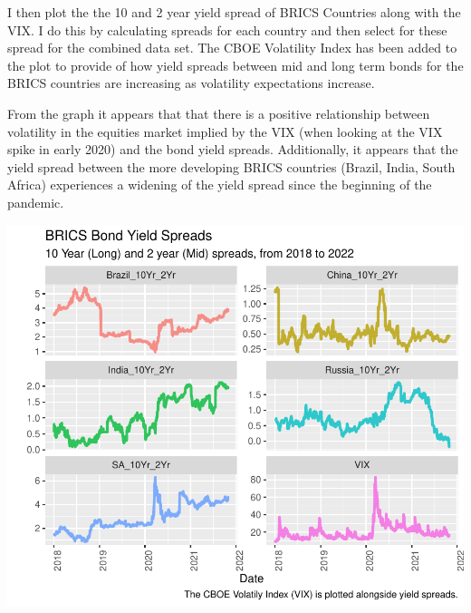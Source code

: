 \documentclass[11pt,preprint, authoryear]{elsarticle}
\numberwithin{equation}{section}
\numberwithin{figure}{section}
\numberwithin{table}{section}
\begin{document}
I then plot the the 10 and 2 year yield spread of BRICS Countries along
with the VIX. I do this by calculating spreads for each country and then
select for these spread for the combined data set. The CBOE Volatility
Index has been added to the plot to provide of how yield spreads between
mid and long term bonds for the BRICS countries are increasing as
volatility expectations increase.

From the graph it appears that that there is a positive relationship
between volatility in the equities market implied by the VIX (when
looking at the VIX spike in early 2020) and the bond yield spreads.
Additionally, it appears that the yield spread between the more
developing BRICS countries (Brazil, India, South Africa) experiences a
widening of the yield spread since the beginning of the pandemic.

\includegraphics{Question2_files/figure-latex/unnamed-chunk-6-1.pdf}


\end{document}
